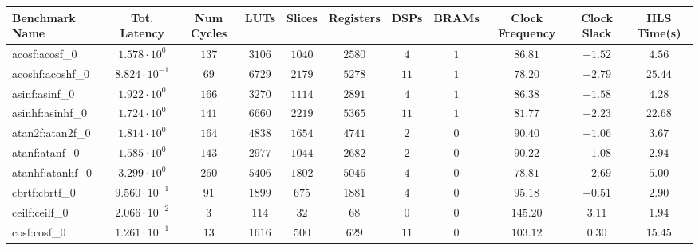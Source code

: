 \begin{tabular}{|l|c|c|c|c|c|c|c|c|c|c|}
\hline
Benchmark Name               & Tot. Latency            & Num Cycles & LUTs       & Slices    & Registers & DSPs    & BRAMs & Clock Frequency & Clock Slack & HLS Time(s) \\
\hline
acosf:acosf\_0               & $ 1.578 \cdot 10^{0}  $ & $ 137    $ & $ 3106   $ & $ 1040  $ & $ 2580  $ & $ 4   $ & $ 1 $ & $ 86.81       $ & $ -1.52   $ & $ 4.56    $ \\
acoshf:acoshf\_0             & $ 8.824 \cdot 10^{-1} $ & $ 69     $ & $ 6729   $ & $ 2179  $ & $ 5278  $ & $ 11  $ & $ 1 $ & $ 78.20       $ & $ -2.79   $ & $ 25.44   $ \\
asinf:asinf\_0               & $ 1.922 \cdot 10^{0}  $ & $ 166    $ & $ 3270   $ & $ 1114  $ & $ 2891  $ & $ 4   $ & $ 1 $ & $ 86.38       $ & $ -1.58   $ & $ 4.28    $ \\
asinhf:asinhf\_0             & $ 1.724 \cdot 10^{0}  $ & $ 141    $ & $ 6660   $ & $ 2219  $ & $ 5365  $ & $ 11  $ & $ 1 $ & $ 81.77       $ & $ -2.23   $ & $ 22.68   $ \\
atan2f:atan2f\_0             & $ 1.814 \cdot 10^{0}  $ & $ 164    $ & $ 4838   $ & $ 1654  $ & $ 4741  $ & $ 2   $ & $ 0 $ & $ 90.40       $ & $ -1.06   $ & $ 3.67    $ \\
atanf:atanf\_0               & $ 1.585 \cdot 10^{0}  $ & $ 143    $ & $ 2977   $ & $ 1044  $ & $ 2682  $ & $ 2   $ & $ 0 $ & $ 90.22       $ & $ -1.08   $ & $ 2.94    $ \\
atanhf:atanhf\_0             & $ 3.299 \cdot 10^{0}  $ & $ 260    $ & $ 5406   $ & $ 1802  $ & $ 5046  $ & $ 4   $ & $ 0 $ & $ 78.81       $ & $ -2.69   $ & $ 5.00    $ \\
cbrtf:cbrtf\_0               & $ 9.560 \cdot 10^{-1} $ & $ 91     $ & $ 1899   $ & $ 675   $ & $ 1881  $ & $ 4   $ & $ 0 $ & $ 95.18       $ & $ -0.51   $ & $ 2.90    $ \\
ceilf:ceilf\_0               & $ 2.066 \cdot 10^{-2} $ & $ 3      $ & $ 114    $ & $ 32    $ & $ 68    $ & $ 0   $ & $ 0 $ & $ 145.20      $ & $ 3.11    $ & $ 1.94    $ \\
cosf:cosf\_0                 & $ 1.261 \cdot 10^{-1} $ & $ 13     $ & $ 1616   $ & $ 500   $ & $ 629   $ & $ 11  $ & $ 0 $ & $ 103.12      $ & $ 0.30    $ & $ 15.45   $ \\

\end{tabular}
